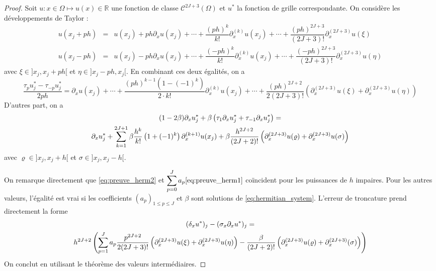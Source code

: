 \begin{proof}
Soit $u : x \in \Omega \mapsto u(x) \in \mathbb{R}$ une fonction de classe $\mathcal{C}^{2J+3}( \Omega)$ et $u^*$ la fonction de grille correspondante.
On considère les développements de Taylor :
\begin{equation}
\begin{array}{rcl}
u(x_j + ph) & = & u(x_j) + p h \partial_x u(x_j) + \cdots + \dfrac{(ph)^k}{k!}\partial_x^{(k)}u(x_j) + \cdots +\dfrac{(ph)^{2J+3}}{(2J+3)!} \partial_x^{(2J+3)}u(\xi)\\
u(x_j - ph) & = & u(x_j) - p h \partial_x u(x_j) + \cdots + \dfrac{(-ph)^k}{k!}\partial_x^{(k)} u(x_j) + \cdots +\dfrac{(-ph)^{2J+3}}{(2J+3)!} \partial_x^{(2J+3)}u(\eta)
\end{array}
\end{equation}
avec $\xi \in ]x_j, x_j+ph[$ et $\eta \in ]x_j-ph, x_j[$. En combinant ces deux égalités, on a
\begin{equation}
\dfrac{\tau_p u^*_j - \tau_{-p} u^*_j}{2ph} = \partial_x u(x_j) + \cdots + \dfrac{(ph)^{k-1}(1 - (-1)^k)}{2 \cdot k!} \partial_x^{(k)}u(x_j) + \cdots +\dfrac{(ph)^{2J+2}}{2(2J+3)!} \left( \partial_x^{(2J+3)}u(\xi) + \partial_x^{(2J+3)}u(\eta) \right)
\label{eq:preuve_herm1}
\end{equation}
D'autres part, on a 
\begin{multline}
(1-2\beta) \partial_x u^*_j + \beta \left( \tau_1 \partial_xu^*_{j} + \tau_{-1} \partial_xu^*_{j} \right) = \\
 \partial_x u^*_j +  \displaystyle\sum\limits_{k=1}^{2J+1} \beta \dfrac{h^{k}}{k!} \left( 1 + (-1)^k \right) \partial_x^{(k+1)}u(x_j)+ \beta \dfrac{h^{2J+2}}{(2J+2)!} \left(\partial_x^{(2J+3)}u(\varrho) + \partial_x^{(2J+3)}u(\sigma) \right) 
\label{eq:preuve_herm2}
\end{multline}
avec $\varrho \in ]x_j, x_j + h[$ et $\sigma \in ]x_j, x_j - h[$. 

On remarque directement que \eqref{eq:preuve_herm2} et $\displaystyle\sum\limits_{p=0}^J a_p  \eqref{eq:preuve_herm1}$ coïncident pour les puissances de $h$ impaires. 
Pour les autres valeurs, l'égalité est vrai si les coefficients $(a_p)_{1 \leq p \leq J}$ et $\beta$ sont solutions de \eqref{eq:hermitian_system}. L'erreur de troncature prend directement la forme 
\begin{multline}
(\delta_{x} u^*)_j - (\sigma_{x} \partial_x u^*)_j = \\
h^{2J+2} \left( \displaystyle\sum\limits_{p=1}^J a_p  \dfrac{p^{2J+2}}{2(2J+3)!} \left( \partial_x^{(2J+3)}u(\xi) + \partial_x^{(2J+3)}u(\eta) \right) - \dfrac{\beta}{(2J+2)!} \left(\partial_x^{(2J+3)}u(\varrho) + \partial_x^{(2J+3)}(\sigma) \right) \right)
\end{multline}
On conclut en utilisant le théorème des valeurs intermédiaires.
\end{proof}

